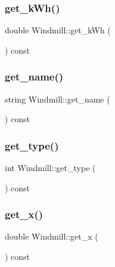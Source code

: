\mbox{\label{class_windmill_aebd4e86003db02f68273aa9a303f0f59}} 
\subsubsection{\texorpdfstring{get\_kWh()}{get\_kWh()}}
{\footnotesize\ttfamily double Windmill\+::get\+\_\+k\+Wh (\begin{DoxyParamCaption}{ }\end{DoxyParamCaption}) const}

\mbox{\label{class_windmill_af92ebf7972106f12cdbc856ef98a829c}} 
\subsubsection{\texorpdfstring{get\_name()}{get\_name()}}
{\footnotesize\ttfamily string Windmill\+::get\+\_\+name (\begin{DoxyParamCaption}{ }\end{DoxyParamCaption}) const}

\mbox{\label{class_windmill_a50457283d873a95457c1cc1b0fd1a33b}} 
\subsubsection{\texorpdfstring{get\_type()}{get\_type()}}
{\footnotesize\ttfamily int Windmill\+::get\+\_\+type (\begin{DoxyParamCaption}{ }\end{DoxyParamCaption}) const}

\mbox{\label{class_windmill_aa26470b5a5f65c3fd83dfbc1455b8f22}} 
\subsubsection{\texorpdfstring{get\_x()}{get\_x()}}
{\footnotesize\ttfamily double Windmill\+::get\+\_\+x (\begin{DoxyParamCaption}{ }\end{DoxyParamCaption}) const}

